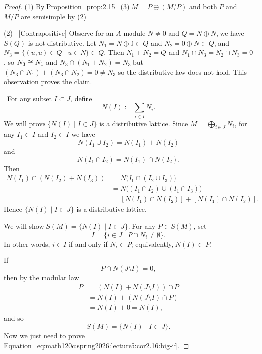 \begin{proof}
(1) By Proposition~\ref{prop:2.15}~(3) $M=P\oplus(M/P)$ and both $P$
  and $M/P$ are semisimple by (2).

(2) \forwardproof\ [Contrapositive] Observe for an $A$-module $N\neq0$
  and $Q=N\oplus N$, we have $S(Q)$ is not distributive. Let
  $N_{1}=N\oplus0\subset Q$ and $N_{2}=0\oplus N\subset Q$, and
  $N_{3}=\{(u,u)\in Q\mid u\in N\}\subset Q$. Then $N_{1}+N_{2}=Q$
  and $N_{1}\cap N_{3}=N_{2}\cap N_{3}=0$, so $N_{3}\cong N_{1}$
  and $N_{3}\cap(N_{1}+N_{2})=N_{3}$ but $(N_{3}\cap N_{1})+(N_{3}\cap N_{2})=0\neq N_{3}$
  so the distributive law does not hold. This observation proves the claim.

\backwardproof\ For any subset $I\subset J$, define
\begin{equation}
N(I) :=\sum_{i\in I}N_{i}.
\end{equation}
We will prove $\{N(I)\mid I\subset J\}$ is a distributive lattice.
Since $M=\bigoplus_{i\in J}N_{i}$, for any $I_{1}\subset I$ and
$I_{2}\subset I$ we have
\begin{equation}
N(I_{1}\cup I_{2})=N(I_{1})+N(I_{2})
\end{equation}
and
\begin{equation}
N(I_{1}\cap I_{2})=N(I_{1})\cap N(I_{2}).
\end{equation}
Then
\begin{subequations}
  \begin{align}
N(I_{1})\cap(N(I_{2})+N(I_{3}))
&= N\bigl(I_{1}\cap(I_{2}\cup I_{3})\bigr)\\
&= N\bigl((I_{1}\cap I_{2})\cup(I_{1}\cap I_{3})\bigr)\\
&=[N(I_{1})\cap N(I_{2})]+[N(I_{1})\cap N(I_{3})].
  \end{align}
\end{subequations}
Hence $\{N(I)\mid I\subset J\}$ is a distributive lattice.

We will show $S(M)=\{N(I)\mid I\subset J\}$. For any $P\in S(M)$, set
\begin{equation}
I=\{i\in J\mid P\cap N_{i}\neq\emptyset\}.
\end{equation}
In other words, $i\in I$ if and only if $N_{i}\subset P$;
equivalently, $N(I)\subset P$.

If
\begin{equation}\label{eq:math120c:spring2026:lecture5:cor2.16:big-if}
P\cap N(J\setminus I)=0,
\end{equation}
then by the modular law
\begin{subequations}
  \begin{align}
P &= (N(I)+N(J\setminus I))\cap P\\
&= N(I)+(N(J\setminus I)\cap P)\\
&= N(I) + 0 = N(I),
  \end{align}
\end{subequations}
and so
\begin{equation}
S(M)=\{N(I)\mid I\subset J\}.
\end{equation}
Now we just need to prove Equation~\eqref{eq:math120c:spring2026:lecture5:cor2.16:big-if}.


\end{proof}
